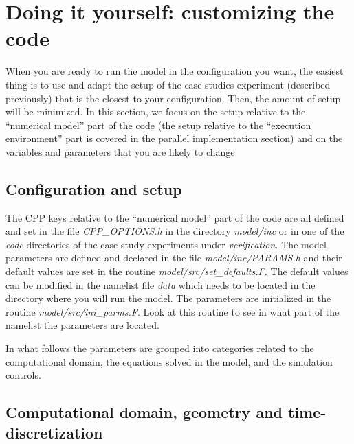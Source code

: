 \section{Doing it yourself: customizing the code}

When you are ready to run the model in the configuration you want, the
easiest thing is to use and adapt the setup of the case studies
experiment (described previously) that is the closest to your
configuration. Then, the amount of setup will be minimized. In this
section, we focus on the setup relative to the ``numerical model''
part of the code (the setup relative to the ``execution environment''
part is covered in the parallel implementation section) and on the
variables and parameters that you are likely to change.

\subsection{Configuration and setup}

The CPP keys relative to the ``numerical model'' part of the code are
all defined and set in the file \textit{CPP\_OPTIONS.h }in the
directory \textit{ model/inc }or in one of the \textit{code
}directories of the case study experiments under
\textit{verification.} The model parameters are defined and declared
in the file \textit{model/inc/PARAMS.h }and their default values are
set in the routine \textit{model/src/set\_defaults.F. }The default
values can be modified in the namelist file \textit{data }which needs
to be located in the directory where you will run the model. The
parameters are initialized in the routine
\textit{model/src/ini\_parms.F}.  Look at this routine to see in what
part of the namelist the parameters are located.

In what follows the parameters are grouped into categories related to
the computational domain, the equations solved in the model, and the
simulation controls.

\subsection{Computational domain, geometry and time-discretization}

